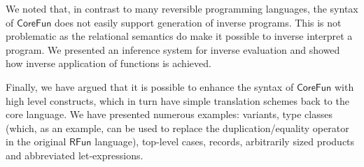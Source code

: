 \documentclass[a4paper,10p,openright]{memoir}
\def\rfunc{\ensuremath{\mathsf{CoreFun}}\xspace}
\def\rfun{\ensuremath{\mathsf{RFun}}\xspace}
\begin{document}
We noted that, in contrast to many reversible programming languages, the syntax
of \rfunc does not easily support generation of inverse programs. This is not
problematic as the relational semantics do make it possible to inverse
interpret a program. We presented an inference system for inverse evaluation
and showed how inverse application of functions is achieved.

Finally, we have argued that it is possible to enhance the syntax of \rfunc
with high level constructs, which in turn have simple translation schemes back
to the core language. We have presented numerous examples: variants, type
classes (which, as an example, can be used to replace the duplication/equality
operator in the original \rfun language), top-level cases, records, arbitrarily
sized products and abbreviated let-expressions.




\end{document}
